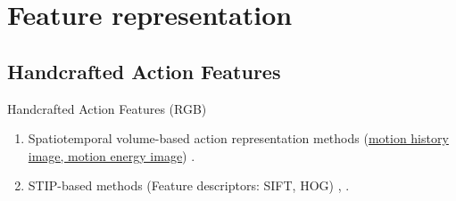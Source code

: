 \section{Feature representation}
\subsection{Handcrafted Action Features}
\begin{frame}{Handcrafted Action Features (RGB)}
    \begin{enumerate}
        \item<1-> Spatiotemporal volume-based action representation methods (\href{https://web.cse.ohio-state.edu/~davis.1719/CVL/Research/MHI/mhi.html}{motion history image, motion energy image}) \cite{li2011human}.
        \item<2-> STIP-based methods (Feature descriptors: SIFT, HOG) \cite{nguyen2014stap}, \cite{dalal2005histograms}.
\end{enumerate}
\end{frame}
